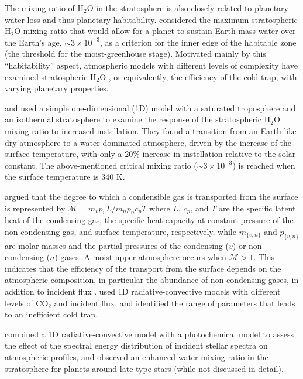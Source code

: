 \documentclass[11pt,numberedappendix,twocolappendix,]{emulateapj}
\def\water{H$_2$O }
\newcommand{\dsa}[1]{{\color{blue}#1}}
\begin{document}
The mixing ratio of \water in the stratosphere is also closely related to planetary water loss and thus planetary habitability. 
\citet{Kasting1993} considered the maximum stratospheric \water mixing ratio that would allow for a planet to sustain Earth-mass water over the Earth's age, $\sim 3 \times 10^{-3}$, as a criterion for the inner edge of the habitable zone (the threshold for the moist-greenhouse stage). 
Motivated mainly by this ``habitability'' aspect, atmospheric models with different levels of complexity have examined stratospheric \water, or equivalently, the efficiency of the cold trap, with varying planetary properties. 

\citet{Kasting1993} and \citet{Kopparapu2013} used a simple one-dimensional (1D) model with a saturated troposphere and an isothermal stratosphere to examine the response of the stratospheric \water mixing ratio to increased instellation. 
They found a transition from an Earth-like dry atmosphere to \dsa{a} water-dominated atmosphere, driven by the increase of the surface temperature, with only a 20\% increase in instellation relative to the solar constant. 
The above-mentioned critical mixing ratio ($\sim 3 \times 10^{-3}$) is reached when the surface temperature is 340 K. 


\citet{Wordsworth2013,Wordsworth2014} argued that the degree to which a condensible gas is transported from the surface is represented by $\mathcal{M} = m_v p_v L / m_n p_n c_p T $ where $L$, $c_p$, and $T$ are the specific latent heat of the condensing gas, the specific heat capacity at constant pressure of the non-condensing gas, and surface  temperature, respectively, while $m_{\{v,n\}}$ and $p_{\{v,n\}}$ are molar masses and the partial pressures of the  condensing ($v$) or non-condensing ($n$) gases. 
A moist upper atmosphere occurs when $\mathcal{M} > 1$. 
This indicates that the efficiency of the transport from the surface depends on the atmospheric composition, in particular the abundance of non-condensing gases, in addition to incident flux \citep{Wordsworth2014}. 
\citet{Wordsworth2013} used 1D radiative-convective models with different levels of CO$_2$ and incident flux, and identified the range of parameters that leads to an inefficient cold trap. 

\citet{Rugheimer2013,Rugheimer2015} combined a 1D radiative-convective model with a photochemical model to assess the effect of the spectral energy distribution of incident stellar spectra on atmospheric profiles, and observed an enhanced water mixing ratio in the stratosphere for planets around late-type stars (while not discussed in detail). 
\end{document}
